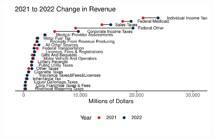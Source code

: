 \documentclass[
  letterpaper,
  DIV=11,
  numbers=noendperiod]{scrreport}
\begin{document}
\begin{figure}[H]

{\centering \includegraphics{./Everything_files/figure-pdf/dotplots-1.pdf}

}

\end{figure}
\end{document}
